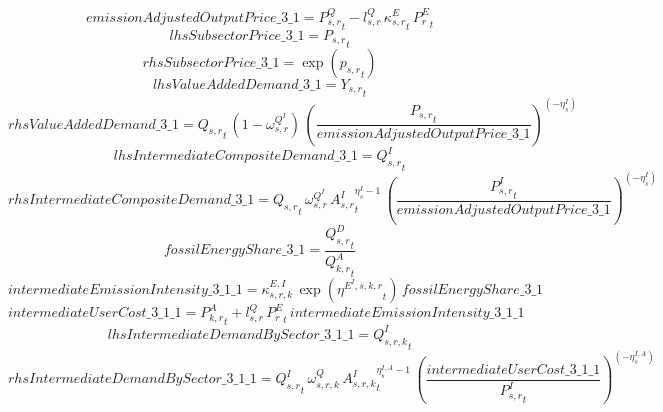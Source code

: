 \begin{dmath*}
emissionAdjustedOutputPrice\_3\_1 = {{P^Q_{s,r}}}_{t}-{{l^{Q}_{s,r}}}\, {{\kappa^{E}_{s,r}}}_{t}\, {{P^E_r}}_{t}
\end{dmath*}
\begin{dmath*}
lhsSubsectorPrice\_3\_1 = {{P_{s,r}}}_{t}
\end{dmath*}
\begin{dmath*}
rhsSubsectorPrice\_3\_1 = \exp\left({{p_{s,r}}}_{t}\right)
\end{dmath*}
\begin{dmath*}
lhsValueAddedDemand\_3\_1 = {{Y_{s,r}}}_{t}
\end{dmath*}
\begin{dmath*}
rhsValueAddedDemand\_3\_1 = {{Q_{s,r}}}_{t}\, \left(1-{{\omega^{Q^{I}}_{s,r}}}\right)\, \left(\frac{{{P_{s,r}}}_{t}}{{emissionAdjustedOutputPrice\_3\_1}}\right)^{\left(-{{\eta^{I}_{s}}}\right)}
\end{dmath*}
\begin{dmath*}
lhsIntermediateCompositeDemand\_3\_1 = {{Q^{I}_{s,r}}}_{t}
\end{dmath*}
\begin{dmath*}
rhsIntermediateCompositeDemand\_3\_1 = {{Q_{s,r}}}_{t}\, {{\omega^{Q^{I}}_{s,r}}}\, {{A^{I}_{s,r}}}_{t}^{{{\eta^{I}_{s}}}-1}\, \left(\frac{{{P^{I}_{s,r}}}_{t}}{{emissionAdjustedOutputPrice\_3\_1}}\right)^{\left(-{{\eta^{I}_{s}}}\right)}
\end{dmath*}
\begin{dmath*}
fossilEnergyShare\_3\_1 = \frac{{{Q^{D}_{s,r}}}_{t}}{{{Q^{A}_{k,r}}}_{t}}
\end{dmath*}
\begin{dmath*}
intermediateEmissionIntensity\_3\_1\_1 = {{\kappa^{E,I}_{s,r,k}}}\, \exp\left({{\eta^{E^{I},s,k,r}}}_{t}\right)\, {fossilEnergyShare\_3\_1}
\end{dmath*}
\begin{dmath*}
intermediateUserCost\_3\_1\_1 = {{P^{A}_{k,r}}}_{t}+{{l^{Q}_{s,r}}}\, {{P^E_r}}_{t}\, {intermediateEmissionIntensity\_3\_1\_1}
\end{dmath*}
\begin{dmath*}
lhsIntermediateDemandBySector\_3\_1\_1 = {{Q^{I}_{s,r,k}}}_{t}
\end{dmath*}
\begin{dmath*}
rhsIntermediateDemandBySector\_3\_1\_1 = {{Q^{I}_{s,r}}}_{t}\, {{\omega^{Q}_{s,r,k}}}\, {{A^{I}_{s,r,k}}}_{t}^{{{\eta^{I,A}_{s}}}-1}\, \left(\frac{{intermediateUserCost\_3\_1\_1}}{{{P^{I}_{s,r}}}_{t}}\right)^{\left(-{{\eta^{I,A}_{s}}}\right)}
\end{dmath*}
